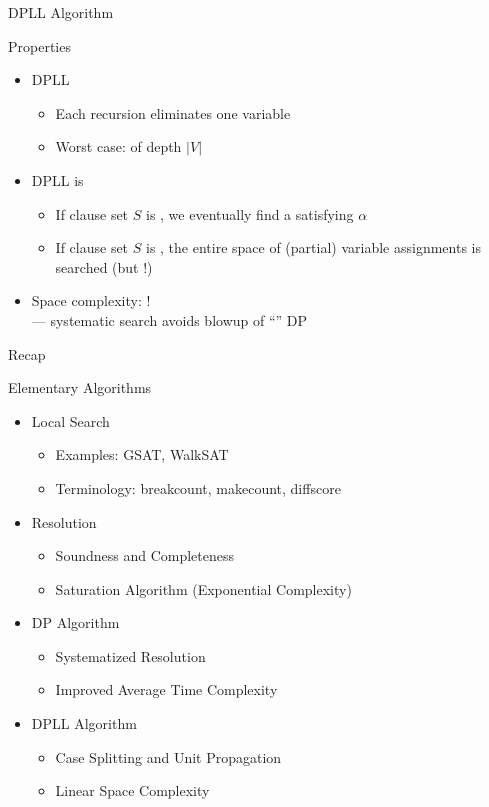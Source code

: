 \documentclass[t]{sdqbeamer}
\begin{document}
\begin{frame}{DPLL Algorithm}
\begin{block}{Properties}
\begin{itemize}\setlength{\itemsep}{1em}
	\item DPLL 
	\begin{itemize}\setlength{\itemsep}{1ex}
		\item Each recursion eliminates one variable
		\item Worst case:  of depth $|V|$
	\end{itemize}
	\item DPLL is 
	\begin{itemize}\setlength{\itemsep}{1ex}
		\item If clause set $S$ is , we eventually find a satisfying $\alpha$
		\item If clause set $S$ is , the entire space of (partial) variable assignments is searched (but !)
	\end{itemize}
	\item Space complexity: !\\
	--- systematic search avoids blowup of ``'' DP
\end{itemize}
\end{block}
\end{frame}

\begin{frame}{Recap}
\begin{block}{Elementary Algorithms}
	\begin{itemize}\setlength{\itemsep}{1ex}
		\item Local Search
		\begin{itemize}
			\item Examples: GSAT, WalkSAT
			\item Terminology: breakcount, makecount, diffscore
		\end{itemize}
		\item Resolution
		\begin{itemize}
			\item Soundness and Completeness
			\item Saturation Algorithm (Exponential Complexity)
		\end{itemize}
		\item DP Algorithm
		\begin{itemize}
			\item Systematized Resolution
			\item Improved Average Time Complexity
		\end{itemize}
		\item DPLL Algorithm
		\begin{itemize}
			\item Case Splitting and Unit Propagation
			\item Linear Space Complexity
		\end{itemize}
	\end{itemize}
\end{block}
\end{frame}
\end{document}
